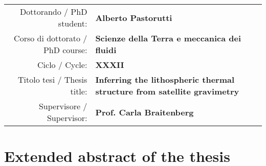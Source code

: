 


\pagestyle{empty}

\begin{adjustbox}{center}
    \begin{tabular}{rp{}}
        \toprule
        Dottorando / PhD student: & \textbf{Alberto Pastorutti} \\
        Corso di dottorato / PhD course: & \textbf{Scienze della Terra e meccanica dei fluidi} \\
        Ciclo / Cycle: & \textbf{XXXII} \\
        Titolo tesi / Thesis title: & \textbf{Inferring the lithospheric thermal structure from satellite gravimetry} \\
        Supervisore / Supervisor: & \textbf{Prof. Carla Braitenberg} \\
        \bottomrule
    \end{tabular}
\end{adjustbox}

\section*{Extended abstract of the thesis}




